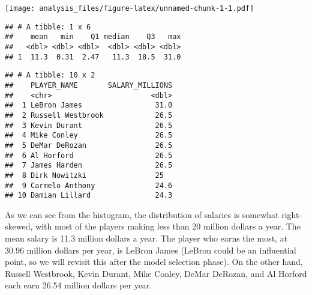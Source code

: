\documentclass[]{article}
\newenvironment{Shaded}{\begin{snugshade}}{\end{snugshade}}
\newcommand{\DataTypeTok}[1]{\textcolor[rgb]{0.13,0.29,0.53}{#1}}
\newcommand{\DecValTok}[1]{\textcolor[rgb]{0.00,0.00,0.81}{#1}}
\newcommand{\FloatTok}[1]{\textcolor[rgb]{0.00,0.00,0.81}{#1}}
\newcommand{\KeywordTok}[1]{\textcolor[rgb]{0.13,0.29,0.53}{\textbf{#1}}}
\newcommand{\NormalTok}[1]{#1}
\newcommand{\OperatorTok}[1]{\textcolor[rgb]{0.81,0.36,0.00}{\textbf{#1}}}
\newcommand{\StringTok}[1]{\textcolor[rgb]{0.31,0.60,0.02}{#1}}
\begin{document}
\texttt{[image: analysis\_files/figure-latex/unnamed-chunk-1-1.pdf]}

\begin{Shaded}
\end{Shaded}

\begin{verbatim}
## # A tibble: 1 x 6
##    mean   min    Q1 median    Q3   max
##   <dbl> <dbl> <dbl>  <dbl> <dbl> <dbl>
## 1  11.3  0.31  2.47   11.3  18.5  31.0
\end{verbatim}

\begin{Shaded}
\end{Shaded}

\begin{verbatim}
## # A tibble: 10 x 2
##    PLAYER_NAME       SALARY_MILLIONS
##    <chr>                       <dbl>
##  1 LeBron James                 31.0
##  2 Russell Westbrook            26.5
##  3 Kevin Durant                 26.5
##  4 Mike Conley                  26.5
##  5 DeMar DeRozan                26.5
##  6 Al Horford                   26.5
##  7 James Harden                 26.5
##  8 Dirk Nowitzki                25  
##  9 Carmelo Anthony              24.6
## 10 Damian Lillard               24.3
\end{verbatim}

As we can see from the histogram, the distribution of salaries is
somewhat right-skewed, with most of the players making less than 20
million dollars a year. The mean salary is 11.3 million dollars a year.
The player who earns the most, at 30.96 million dollars per year, is
LeBron James (LeBron could be an influential point, so we will revisit
this after the model selection phase). On the other hand, Russell
Westbrook, Kevin Durant, Mike Conley, DeMar DeRozan, and Al Horford each
earn 26.54 million dollars per year.
\end{document}
